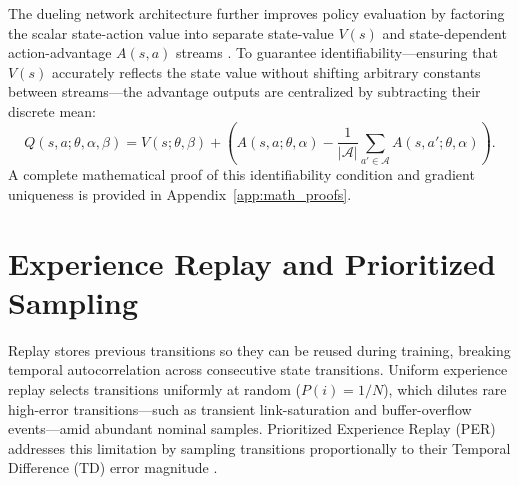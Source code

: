 \documentclass[12pt,a4paper,oneside]{report}
\let\cite\citep
\begin{document}
The dueling network architecture further improves policy evaluation by factoring the scalar state-action value into separate state-value $V(s)$ and state-dependent action-advantage $A(s, a)$ streams \cite{wang2016dueling}. To guarantee identifiability---ensuring that $V(s)$ accurately reflects the state value without shifting arbitrary constants between streams---the advantage outputs are centralized by subtracting their discrete mean:
\begin{equation}
\label{eq:dueling_aggregation}
Q(s, a; \theta, \alpha, \beta) = V(s; \theta, \beta) + \left( A(s, a; \theta, \alpha) - \frac{1}{|\mathcal{A}|} \sum_{a' \in \mathcal{A}} A(s, a'; \theta, \alpha) \right).
\end{equation}
A complete mathematical proof of this identifiability condition and gradient uniqueness is provided in Appendix~\ref{app:math_proofs}.

\section{Experience Replay and Prioritized Sampling}
Replay stores previous transitions so they can be reused during training, breaking temporal autocorrelation across consecutive state transitions. Uniform experience replay selects transitions uniformly at random ($P(i) = 1/N$), which dilutes rare high-error transitions---such as transient link-saturation and buffer-overflow events---amid abundant nominal samples. Prioritized Experience Replay (PER) addresses this limitation by sampling transitions proportionally to their Temporal Difference (TD) error magnitude \cite{schaul2016prioritized}.
\end{document}
